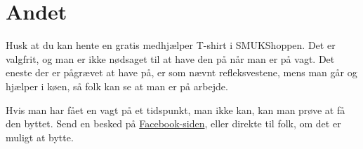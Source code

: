 \section{Andet}
\label{sec:andet}

Husk at du kan hente en gratis medhjælper T-shirt i SMUKShoppen. Det er valgfrit, og man 
er ikke nødsaget til at have den på når man er på vagt. Det eneste der er pågrævet at 
have på, er som nævnt refleksvestene, mens man går og hjælper i køen, så folk kan se at 
man er på arbejde.

Hvis man har fået en vagt på et tidspunkt, man ikke kan, kan man prøve
at få den byttet. Send en besked på 
\href{https://www.facebook.com/groups/522504429506820}{Facebook-siden}, eller direkte til folk, om 
det er muligt at bytte.